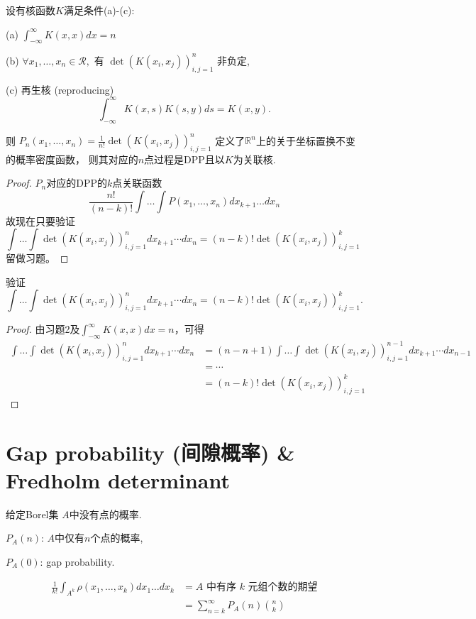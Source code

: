 \begin{theorem}
    设有核函数$K$满足条件(a)-(c):
    
(a) $\int_{-\infty}^{\infty}K(x,x)dx=n$

(b) $\forall x_{1},\dots,x_{n}\in\mathcal{R},$ 有 $\det(K(x_i, x_j))_{i,j=1}^n$ 非负定,

(c) 再生核 (reproducing)
\[ \int_{-\infty}^{\infty} K(x,s)K(s,y)ds = K(x,y). \]

则 $P_{n}(x_{1},\dots,x_{n})=\frac{1}{n!}\det(K(x_{i},x_{j}))_{i,j=1}^{n}$
定义了$\mathbb{R}^n$上的关于坐标置换不变的概率密度函数，
则其对应的$n$点过程是DPP且以$K$为关联核.
    
\end{theorem}

\begin{proof}
    $P_n$对应的DPP的$k$点关联函数
\[ \frac{n!}{(n-k)!}\int\dots\int P(x_{1},\dots,x_{n})dx_{k+1} \dots dx_{n} \]
故现在只要验证
\[ \int\dots\int \det(K(x_{i},x_{j}))_{i,j=1}^{n}dx_{k+1} \cdots dx_{n} 
=(n-k)!\det(K(x_{i},x_{j}))_{i,j=1}^{k} \quad  \]
留做习题。
\end{proof}
\begin{3}
验证\[ \int\dots\int \det(K(x_{i},x_{j}))_{i,j=1}^{n}dx_{k+1} \cdots dx_{n} 
=(n-k)!\det(K(x_{i},x_{j}))_{i,j=1}^{k}   .\]
\end{3}
\begin{proof}
由习题2及$\int_{-\infty}^{\infty}K(x,x)dx=n$，可得
\begin{equation*}
    \begin{aligned}
        \int\dots\int \det(K(x_{i},x_{j}))_{i,j=1}^{n}dx_{k+1} \cdots dx_{n}
        &=(n-n+1)\int\dots\int \det(K(x_{i},x_{j}))_{i,j=1}^{n-1}dx_{k+1} \cdots dx_{n-1}\\
        &=\cdots\\
        &=(n-k)!\det(K(x_{i},x_{j}))_{i,j=1}^{k} 
    \end{aligned}
\end{equation*}
\end{proof}
\section{ Gap probability (间隙概率) \& Fredholm determinant}

给定Borel集 $A$中没有点的概率.

$P_{A}(n)$: $A$中仅有$n$个点的概率,

$P_{A}(0)$: gap probability.

\begin{equation*}
    \begin{aligned}
        \frac{1}{k!}\int_{A^{k}}\rho(x_{1},\dots,x_{k})dx_{1} \dots dx_{k}
        &=\text{$A$ 中有序 $k$ 元组个数的期望}\\
        &=\sum_{n=k}^{\infty}P_{A}(n)\binom{n}{k}
    \end{aligned}
\end{equation*}

